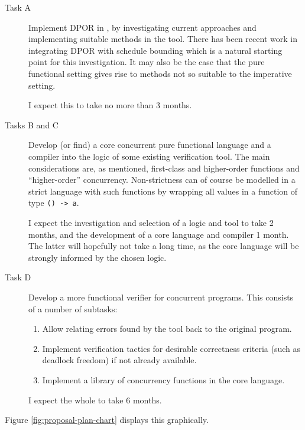 \begin{description}
  \item[Task A] Implement DPOR in \dejafu{}, by investigating current
    approaches and implementing suitable methods in the tool. There
    has been recent work in integrating DPOR with schedule
    bounding\cite{bpor} which is a natural starting point for this
    investigation. It may also be the case that the pure functional
    setting gives rise to methods not so suitable to the imperative
    setting.

    I expect this to take no more than 3 months.

  \item[Tasks B and C] Develop (or find) a core concurrent pure
    functional language and a compiler into the logic of some existing
    verification tool. The main considerations are, as mentioned,
    first-class and higher-order functions and ``higher-order''
    concurrency. Non-strictness can of course be modelled in a strict
    language with such functions by wrapping all values in a function
    of type \verb|() -> a|.

    I expect the investigation and selection of a logic and tool
    to take 2 months, and the development of a core language and
    compiler 1 month. The latter will hopefully not take a long time,
    as the core language will be strongly informed by the chosen
    logic.

  \item[Task D] Develop a more functional verifier for concurrent
    programs. This consists of a number of subtasks:

    \begin{enumerate}
      \item Allow relating errors found by the tool back to the
        original program.
      \item Implement verification tactics for desirable correctness
        criteria (such as deadlock freedom) if not already available.
      \item Implement a library of concurrency functions in the core
        language.
    \end{enumerate}

    I expect the whole to take 6 months.
\end{description}

Figure \ref{fig:proposal-plan-chart} displays this graphically.


